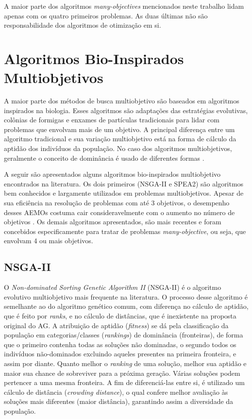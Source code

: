 A maior parte dos algoritmos \textit{many-objectives} mencionados neste trabalho lidam apenas com os quatro primeiros problemas. As duas últimas não são responsabilidade dos algoritmos de otimização em si.

\section{Algoritmos Bio-Inspirados Multiobjetivos}

A maior parte dos métodos de busca multiobjetivo são baseados em algoritmos inspirados na biologia. Esses algoritmos são adaptações das estratégias evolutivas, colônias de formigas e enxames de partículas tradicionais para lidar com problemas que envolvam mais de um objetivo. A principal diferença entre um algoritmo tradicional e sua variação multiobjetivo está na forma de cálculo da aptidão dos indivíduos da população. No caso dos algoritmos multiobjetivos, geralmente o conceito de dominância é usado de diferentes formas \cite{Bueno2010}.

A seguir são apresentados alguns algoritmos bio-inspirados multiobjetivo encontrados na literatura. Os dois primeiros (NSGA-II e SPEA2) são algoritmos bem conhecidos e largamente utilizados em problemas multiobjetivos. Apesar de sua eficiência na resolução de problemas com até 3 objetivos, o desempenho desses AEMOs costuma cair consideravelmente com o aumento no número de objetivos \cite{Franca2017}. Os demais algoritmos apresentados, são mais recentes e foram concebidos especificamente para tratar de problemas \textit{many-objective}, ou seja, que envolvam 4 ou mais objetivos.

\subsection{NSGA-II}
O \textit{Non-dominated Sorting Genetic Algorithm II} (NSGA-II) \cite{Deb2002} é o algoritmo evolutivo multiobjetivo mais frequente na literatura. O processo desse algoritmo é semelhante ao do algoritmo genético comum, com diferença no cálculo de aptidão, que é feito por \textit{ranks}, e no cálculo de distâncias, que é inexistente na proposta original do AG. A atribuição de aptidão (\textit{fitness}) se dá pela classificação da população em categorias/classes (\textit{rankings}) de dominância (fronteiras), de forma que o primeiro contenha todas as soluções não dominadas, o segundo todos os indivíduos não-dominados excluindo aqueles presentes na primeira fronteira, e assim por diante. Quanto melhor o \textit{ranking} de uma solução, melhor sua aptidão e  maior sua chance de sobreviver para a próxima geração. Várias soluções podem pertencer a uma mesma fronteira. A fim de diferenciá-las entre si, é utilizado um cálculo de distância (\textit{crowding distance}), o qual confere melhor avaliação às soluções mais diferentes (maior distância), garantindo assim a diversidade da população.


